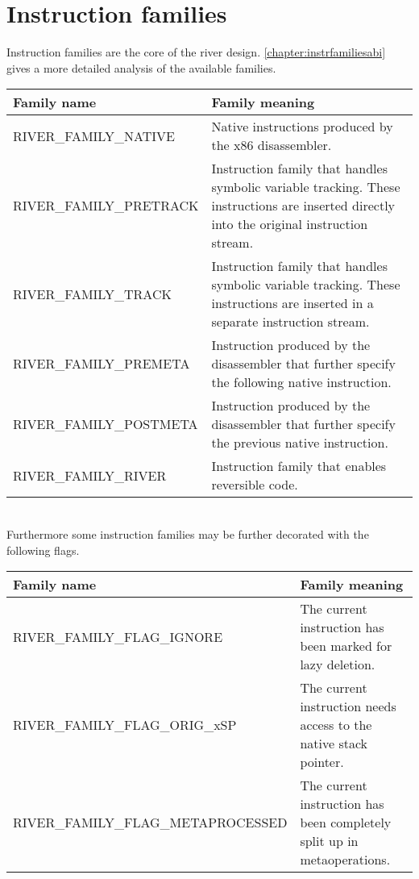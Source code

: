 \documentclass[12pt]{report}
\begin{document}
\section{Instruction families}
\label{sec:instrfamilies}
Instruction families are the core of the river design. \autoref{chapter:instrfamiliesabi} gives a more detailed analysis of the available families.\\
\begin{tabular}{| p{6cm} | p{10cm} |}
\hline
	\textbf{Family name} & \textbf{Family meaning}\\ \hline
	RIVER_FAMILY_NATIVE & Native instructions produced by the x86 disassembler.\\ \hline
	RIVER_FAMILY_PRETRACK & Instruction family that handles symbolic variable tracking. These instructions are inserted directly into the original instruction stream.\\ \hline
	RIVER_FAMILY_TRACK & Instruction family that handles symbolic variable tracking. These instructions are inserted in a separate instruction stream.\\ \hline
	RIVER_FAMILY_PREMETA & Instruction produced by the disassembler that further specify the following native instruction.\\ \hline
	RIVER_FAMILY_POSTMETA & Instruction produced by the disassembler that further specify the previous native instruction.\\ \hline
	RIVER_FAMILY_RIVER & Instruction family that enables reversible code.\\ \hline
\end{tabular} \\
\newline
Furthermore some instruction families may be further decorated with the following flags.\\
\begin{tabular}{| p{8cm} | p{8cm} |}
\hline
	\textbf{Family name} & \textbf{Family meaning}\\ \hline
	RIVER_FAMILY_FLAG_IGNORE & The current instruction has been marked for lazy deletion.\\ \hline
	RIVER_FAMILY_FLAG_ORIG_xSP & The current instruction needs access to the native stack pointer.\\ \hline
	RIVER_FAMILY_FLAG_METAPROCESSED & The current instruction has been completely split up in metaoperations.\\ \hline
\end{tabular}
\end{document}
